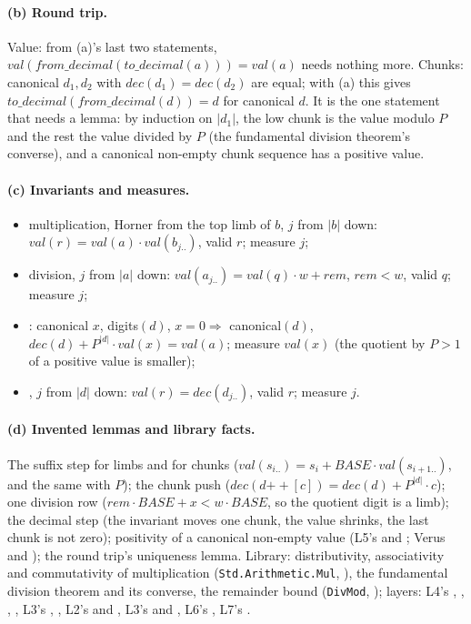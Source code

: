 \documentclass[11pt]{article}
\begin{document}
\paragraph{(b) Round trip.} Value: from (a)'s last two statements,
$\mathit{val}(\mathit{from\_decimal}(\mathit{to\_decimal}(a))) =
\mathit{val}(a)$ needs nothing more. Chunks: canonical $d_1, d_2$ with
$\mathit{dec}(d_1) = \mathit{dec}(d_2)$ are equal; with (a) this gives
$\mathit{to\_decimal}(\mathit{from\_decimal}(d)) = d$ for canonical $d$. It is
the one statement that needs a lemma: by induction on $|d_1|$, the low chunk
is the value modulo $P$ and the rest the value divided by $P$ (the
fundamental division theorem's converse), and a canonical non-empty chunk
sequence has a positive value.

\paragraph{(c) Invariants and measures.}
\begin{itemize}
\item multiplication, Horner from the top limb of $b$, $j$ from $|b|$ down:
  $\mathit{val}(r) = \mathit{val}(a)\cdot\mathit{val}(b_{j..})$, valid $r$;
  measure $j$;
\item division, $j$ from $|a|$ down: $\mathit{val}(a_{j..}) =
  \mathit{val}(q)\cdot w + \mathit{rem}$, $\mathit{rem} < w$, valid $q$;
  measure $j$;
\item {}: canonical $x$, digits$(d)$, $x = 0 \Rightarrow$
  canonical$(d)$, $\mathit{dec}(d) + P^{|d|}\cdot\mathit{val}(x) =
  \mathit{val}(a)$; measure $\mathit{val}(x)$ (the quotient by $P > 1$ of a
  positive value is smaller);
\item {}, $j$ from $|d|$ down: $\mathit{val}(r) =
  \mathit{dec}(d_{j..})$, valid $r$; measure $j$.
\end{itemize}

\paragraph{(d) Invented lemmas and library facts.} The suffix step for limbs
and for chunks ($\mathit{val}(s_{i..}) = s_i + \mathit{BASE}\cdot
\mathit{val}(s_{i+1..})$, and the same with $P$); the chunk push
($\mathit{dec}(d \mathbin{+\!\!+} [c]) = \mathit{dec}(d) + P^{|d|}\cdot c$); one
division row ($\mathit{rem}\cdot\mathit{BASE} + x < w\cdot\mathit{BASE}$, so the
quotient digit is a limb); the decimal step (the invariant moves one chunk,
the value shrinks, the last chunk is not zero); positivity of a canonical
non-empty value (L5's  and ; Verus
 and ); the round trip's
uniqueness lemma. Library: distributivity, associativity and commutativity
of multiplication (\texttt{Std.Arithmetic.Mul}, ),
the fundamental division theorem and its converse, the remainder bound
(\texttt{DivMod}, ); layers: L4's
, , , , L3's
, , L2's  and
, L3's  and , L6's
, L7's .
\end{document}
